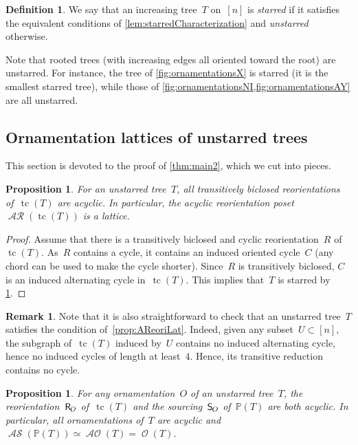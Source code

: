 \documentclass{amsart}
\newtheorem{proposition}[theorem]{Proposition}
\theoremstyle{definition}
\newtheorem{definition}[theorem]{Definition}
\newtheorem{remark}[theorem]{Remark}
\renewcommand{\c}[1]{\mathcal{#1}} %
\DeclareMathOperator{\tc}{tc} %
\newcommand{\darkblue}{\color{darkblue}} %
\newcommand{\defn}[1]{\textsl{\darkblue #1}} %
\newcommand{\mymap}[2]{\mathsf{#1}_{\hspace{-.7pt}#2}}
\DeclareMathOperator{\Orn}{\c{O}}  %
\DeclareMathOperator{\AOrn}{\c{AO}}  %
\newcommand{\reori}[1]{\mymap{R}{#1}}  %
\DeclareMathOperator{\AReori}{\c{AR}}  %
\newcommand{\sour}[1]{\mymap{S}{#1}}  %
\DeclareMathOperator{\ASour}{\mathcal{AS}}  %
\newcommand{\PP}{\mathbb P} %
\begin{document}
\begin{definition}
\label{def:starredTree}
We say that an increasing tree~$T$ on~$[n]$ is \defn{starred} if it satisfies the equivalent conditions of \cref{lem:starredCharacterization} and \defn{unstarred} otherwise.
\end{definition}

Note that rooted trees (with increasing edges all oriented toward the root) are unstarred.
For instance, the tree of \cref{fig:ornamentationsX} is starred (it is the smallest starred tree), while those of \cref{fig:ornamentationsNI,fig:ornamentationsAY} are all unstarred.


\subsection{Ornamentation lattices of unstarred trees}
\label{subsec:OrnUT}

This section is devoted to the proof of \cref{thm:main2}, which we cut into pieces.

\begin{proposition}
\label{prop:AReoriLatticeUT}
For an unstarred tree~$T$, all transitively biclosed reorientations of~$\tc(T)$ are acyclic.
In particular, the acyclic reorientation poset~$\AReori(\tc(T))$ is a lattice.
\end{proposition}

\begin{proof}
Assume that there is a transitively biclosed and cyclic reorientation~$R$ of~$\tc(T)$.
As~$R$ contains a cycle, it contains an induced oriented cycle~$C$ (any chord can be used to make the cycle shorter).
Since~$R$ is transitively biclosed, $C$ is an induced alternating cycle in~$\tc(T)$.
This implies that~$T$ is starred by \cref{def:starredTree}.
\end{proof}

\begin{remark}
Note that it is also straightforward to check that an unstarred tree~$T$ satisfies the condition of~\cref{prop:AReoriLat}.
Indeed, given any subset~$U \subset [n]$, the subgraph of~$\tc(T)$ induced by~$U$ contains no induced alternating cycle, hence no induced cycles of length at least~$4$.
Hence, its transitive reduction contains no cycle.
\end{remark}

\begin{proposition}
\label{prop:AOrnLatticeUT}
For any ornamentation~$O$ of an unstarred tree~$T$, the reorientation~$\reori{O}$ of~$\tc(T)$ and the sourcing~$\sour{O}$ of~$\PP(T)$ are both acyclic.
In particular, all ornamentations of~$T$ are acyclic and~$\ASour(\PP(T)) \simeq \AOrn(T) = \Orn(T)$.
\end{proposition}
\end{document}
